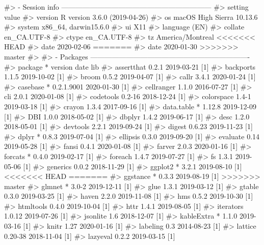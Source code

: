 \documentclass[
]{jss}
\begin{document}
\begin{CodeChunk}
\begin{CodeInput}
\begin{CodeChunk}
\begin{CodeOutput}
#> - Session info ---------------------------------------------------------------
#>  setting  value                       
#>  version  R version 3.6.0 (2019-04-26)
#>  os       macOS High Sierra 10.13.6   
#>  system   x86_64, darwin15.6.0        
#>  ui       X11                         
#>  language (EN)                        
#>  collate  en_CA.UTF-8                 
#>  ctype    en_CA.UTF-8                 
#>  tz       America/Montreal            
<<<<<<< HEAD
#>  date     2020-02-06                  
=======
#>  date     2020-01-30                  
>>>>>>> master
#> 
#> - Packages -------------------------------------------------------------------
#>  package     * version    date       lib
#>  assertthat    0.2.1      2019-03-21 [1]
#>  backports     1.1.5      2019-10-02 [1]
#>  broom         0.5.2      2019-04-07 [1]
#>  callr         3.4.1      2020-01-24 [1]
#>  casebase    * 0.2.1.9001 2020-01-30 [1]
#>  cellranger    1.1.0      2016-07-27 [1]
#>  cli           2.0.1      2020-01-08 [1]
#>  codetools     0.2-16     2018-12-24 [1]
#>  colorspace    1.4-1      2019-03-18 [1]
#>  crayon        1.3.4      2017-09-16 [1]
#>  data.table  * 1.12.8     2019-12-09 [1]
#>  DBI           1.0.0      2018-05-02 [1]
#>  dbplyr        1.4.2      2019-06-17 [1]
#>  desc          1.2.0      2018-05-01 [1]
#>  devtools      2.2.1      2019-09-24 [1]
#>  digest        0.6.23     2019-11-23 [1]
#>  dplyr       * 0.8.3      2019-07-04 [1]
#>  ellipsis      0.3.0      2019-09-20 [1]
#>  evaluate      0.14       2019-05-28 [1]
#>  fansi         0.4.1      2020-01-08 [1]
#>  farver        2.0.3      2020-01-16 [1]
#>  forcats     * 0.4.0      2019-02-17 [1]
#>  foreach       1.4.7      2019-07-27 [1]
#>  fs            1.3.1      2019-05-06 [1]
#>  generics      0.0.2      2018-11-29 [1]
#>  ggplot2     * 3.2.1      2019-08-10 [1]
<<<<<<< HEAD
=======
#>  ggstance    * 0.3.3      2019-08-19 [1]
>>>>>>> master
#>  glmnet      * 3.0-2      2019-12-11 [1]
#>  glue          1.3.1      2019-03-12 [1]
#>  gtable        0.3.0      2019-03-25 [1]
#>  haven         2.2.0      2019-11-08 [1]
#>  hms           0.5.2      2019-10-30 [1]
#>  htmltools     0.4.0      2019-10-04 [1]
#>  httr          1.4.1      2019-08-05 [1]
#>  iterators     1.0.12     2019-07-26 [1]
#>  jsonlite      1.6        2018-12-07 [1]
#>  kableExtra  * 1.1.0      2019-03-16 [1]
#>  knitr         1.27       2020-01-16 [1]
#>  labeling      0.3        2014-08-23 [1]
#>  lattice       0.20-38    2018-11-04 [1]
#>  lazyeval      0.2.2      2019-03-15 [1]

\end{CodeOutput}
\end{CodeChunk}
\end{CodeInput}
\end{CodeChunk}
\end{document}
